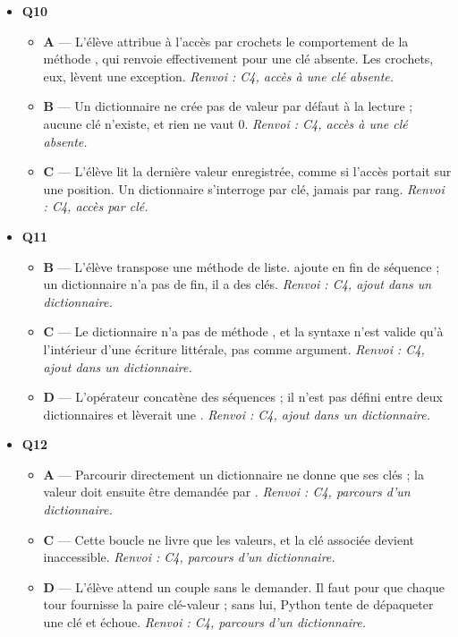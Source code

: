 \begin{itemize}
\begin{itemize}
  \end{itemize}
  \item \textbf{Q10}
  \begin{itemize}
    \item \textbf{A} — L'élève attribue à l'accès par crochets le comportement de la méthode , qui renvoie effectivement  pour une clé absente. Les crochets, eux, lèvent une exception. \emph{Renvoi : C4, accès à une clé absente.}
    \item \textbf{B} — Un dictionnaire ne crée pas de valeur par défaut à la lecture ; aucune clé  n'existe, et rien ne vaut $0$. \emph{Renvoi : C4, accès à une clé absente.}
    \item \textbf{C} — L'élève lit la dernière valeur enregistrée, comme si l'accès portait sur une position. Un dictionnaire s'interroge par clé, jamais par rang. \emph{Renvoi : C4, accès par clé.}
  \end{itemize}
  \item \textbf{Q11}
  \begin{itemize}
    \item \textbf{B} — L'élève transpose une méthode de liste.  ajoute en fin de séquence ; un dictionnaire n'a pas de fin, il a des clés. \emph{Renvoi : C4, ajout dans un dictionnaire.}
    \item \textbf{C} — Le dictionnaire n'a pas de méthode , et la syntaxe  n'est valide qu'à l'intérieur d'une écriture littérale, pas comme argument. \emph{Renvoi : C4, ajout dans un dictionnaire.}
    \item \textbf{D} — L'opérateur \code{+} concatène des séquences ; il n'est pas défini entre deux dictionnaires et lèverait une . \emph{Renvoi : C4, ajout dans un dictionnaire.}
  \end{itemize}
  \item \textbf{Q12}
  \begin{itemize}
    \item \textbf{A} — Parcourir directement un dictionnaire ne donne que ses clés ; la valeur doit ensuite être demandée par . \emph{Renvoi : C4, parcours d'un dictionnaire.}
    \item \textbf{C} — Cette boucle ne livre que les valeurs, et la clé associée devient inaccessible. \emph{Renvoi : C4, parcours d'un dictionnaire.}
    \item \textbf{D} — L'élève attend un couple sans le demander. Il faut  pour que chaque tour fournisse la paire clé-valeur ; sans lui, Python tente de dépaqueter une clé et échoue. \emph{Renvoi : C4, parcours d'un dictionnaire.}

\end{itemize}
\end{itemize}
